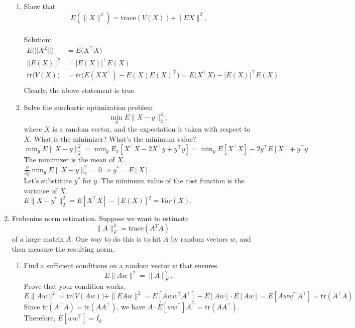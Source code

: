 \documentclass[12pt]{article}
\newcommand{\tr}{\mathrm{tr}}
\begin{document}
\begin{enumerate}
\begin{enumerate}
\item Show that 
\[
E(\|X\|^2) = \mbox{trace}(V(X))  + \|EX\|^2.
\]
\null\\

\noindent
Solution: \\
\begin{align*}
E \big( ||X^2|| \big) &= E \big (X^\top X \big) \\
|| E(X) || ^2 &= \big[ E(X) \big]^\top E(X) \\
\tr \Big( V(X) \Big ) &= tr \Big( E(XX^\top) - E(X) E(X)^\top \Big) = E \big(X^\top X \big) -\big[ E(X) \big]^\top E(X)\\
\end{align*}
Clearly, the above statement is true.\\

\item Solve the stochastic optimization problem 
\[
\min_y E\|X - y\|_2^2,
\]
where $X$ is a random vector, and the expectation is taken with respect to $X$.
What is the minimizer? What's the minimum value? \\

\noindent
$\min_y E\|X - y\|_2^2 = \min_y E_x [X^\top X - 2X^\top y + y^\top y] = \min_y E[X^\top X] - 2y^\top E[X] + y^\top y$ \\


\noindent
The minimizer is the mean of $X$. \\
$\frac{\partial}{\partial y} \min_y E\|X - y\|_2^2 = 0 \Rightarrow y^* = E[X]$.\\  

\noindent
Let's substitute $y^*$ for $y$.  The minimum value of the cost function is the variance of $X$. \\
$E\|X - y^*\|_2^2 = E[X^\top X] - [E(X)]^2 = Var(X)$.  \\
\end{enumerate}

\item Frobenius norm estimation. Suppose we want to estimate 
\[
\|A\|_F^2 = \mbox{trace}(A^TA)
\]
of a large matrix $A$. One way to do this is to hit $A$ by random vectors $w$, and then measure 
the resulting norm. 
\begin{enumerate}
\item Find a sufficient conditions on a random vector $w$  that ensures 
\[
E \|Aw\|^2 = \|A\|_F^2.
\]
Prove that your condition works. \\

\noindent
$E \|Aw\|^2 = \tr \Big(V(Aw)\Big) + \|E Aw \|^2 = E [Aw w^\top A^\top ] - E[Aw] \cdot E[Aw] = E[Aw w^\top A^\top] = \tr(A^\top A) $\\
Since $\tr(A^\top A) = \tr(AA^\top)$, we have $A \cdot E[w w^\top] A^\top = \tr(A A^\top)$. \\
Therefore, $E[w w^\top] = I_k$ \\



\end{enumerate}
\end{enumerate}
\end{document}

